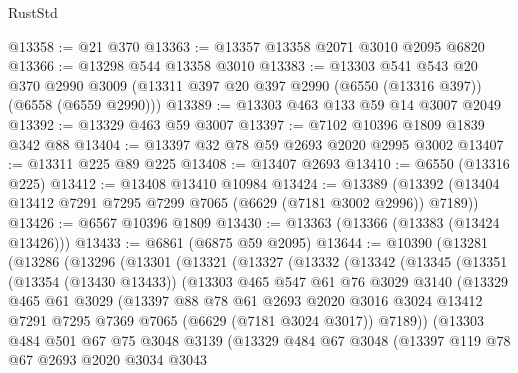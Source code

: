 \begin{lexlean}{RustStd}
\begin{coremodule}
@13358 := @21 @370
@13363 := @13357 @13358 @2071 @3010 @2095 @6820
@13366 := @13298 @544 @13358 @3010
@13383 := @13303
    @541
    @543
    @20
    @370
    @2990
    @3009
    (@13311 @397 @20 @397 @2990 (@6550 (@13316 @397)) (@6558 (@6559 @2990)))
@13389 := @13303 @463 @133 @59 @14 @3007 @2049
@13392 := @13329 @463 @59 @3007
@13397 := @7102 @10396 @1809 @1839 @342 @88
@13404 := @13397 @32 @78 @59 @2693 @2020 @2995 @3002
@13407 := @13311 @225 @89 @225
@13408 := @13407 @2693
@13410 := @6550 (@13316 @225)
@13412 := @13408 @13410 @10984
@13424 := @13389 (@13392 (@13404 @13412 @7291 @7295 @7299 @7065 (@6629 (@7181 @3002 @2996)) @7189))
@13426 := @6567 @10396 @1809
@13430 := @13363 (@13366 (@13383 (@13424 @13426)))
@13433 := @6861 (@6875 @59 @2095)
@13644 := @10390
    (@13281
      (@13286
        (@13296
          (@13301
            (@13321
              (@13327
                (@13332
                  (@13342
                    (@13345
                      (@13351
                        (@13354 (@13430 @13433))
                        (@13303
                          @465
                          @547
                          @61
                          @76
                          @3029
                          @3140
                          (@13329
                            @465
                            @61
                            @3029
                            (@13397
                              @88
                              @78
                              @61
                              @2693
                              @2020
                              @3016
                              @3024
                              @13412
                              @7291
                              @7295
                              @7369
                              @7065
                              (@6629 (@7181 @3024 @3017))
                              @7189))
                          (@13303
                            @484
                            @501
                            @67
                            @75
                            @3048
                            @3139
                            (@13329
                              @484
                              @67
                              @3048
                              (@13397
                                @119
                                @78
                                @67
                                @2693
                                @2020
                                @3034
                                @3043

\end{coremodule}
\end{lexlean}
